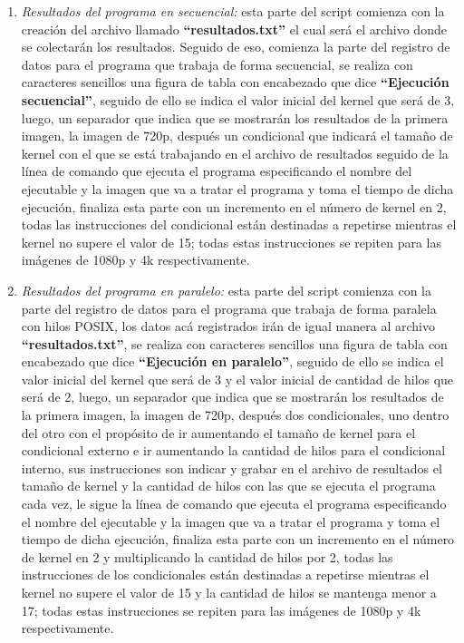 \documentclass[a4paper,10pt]{IEEEtran}
\begin{document}
\begin{enumerate}
\begin{enumerate}
        \item \textit{Resultados del programa en secuencial:} esta parte del script comienza con la creaci\'on del archivo llamado \textbf{“resultados.txt”} el cual ser\'a el archivo donde se colectar\'an los resultados. Seguido de eso, comienza la parte del registro de datos para el programa que trabaja de forma secuencial, se realiza con caracteres sencillos una figura de tabla con encabezado que dice
        \textbf{“Ejecución secuencial”}, seguido de ello se indica el valor inicial del kernel que ser\'a de 3, luego, un separador que indica que se mostrar\'an los resultados de la primera imagen, la imagen de 720p, despu\'es un condicional que indicar\'a el tama\~no de kernel con el que se est\'a trabajando en el archivo de resultados seguido de la l\'inea de comando que ejecuta el programa especificando el nombre del ejecutable y la imagen que va a tratar el programa y toma el tiempo de dicha ejecuci\'on, finaliza esta parte con un incremento en el n\'umero de kernel en 2, todas las instrucciones del condicional est\'an destinadas a repetirse mientras el kernel no supere el valor de 15; todas estas
        instrucciones se repiten para las im\'agenes de 1080p y 4k
        respectivamente. \\
        
        \item \textit{Resultados del programa en paralelo:} esta parte del script comienza con la parte del registro de datos para el programa que trabaja de forma paralela con hilos POSIX, los datos ac\'a registrados ir\'an de igual manera al archivo \textbf{“resultados.txt”}, se realiza con caracteres sencillos una figura de tabla con encabezado que dice \textbf{“Ejecuci\'on en paralelo”}, seguido de ello se indica el valor inicial del kernel que ser\'a de 3 y el valor inicial de cantidad de hilos que ser\'a de 2, luego, un separador que indica que se mostrar\'an los resultados de la primera imagen, la imagen de 720p, despu\'es dos
        condicionales, uno dentro del otro con el prop\'osito de ir aumentando el tama\~no de kernel para el condicional externo e ir aumentando la cantidad de hilos para el condicional interno, sus instrucciones son indicar y grabar en el archivo de resultados el tama\~no de kernel y la cantidad de hilos con las que se ejecuta el programa cada vez, le sigue
        la l\'inea de comando que ejecuta el programa especificando el nombre del ejecutable y la imagen que va a tratar el programa y toma el tiempo de dicha ejecuci\'on, finaliza esta parte con un incremento en el n\'umero de kernel en 2 y multiplicando la cantidad de hilos por 2, todas las instrucciones de los condicionales est\'an destinadas a repetirse mientras el kernel no supere el valor de 15 y la cantidad de hilos se mantenga menor a 17; todas estas instrucciones se repiten para las im\'agenes de 1080p y 4k respectivamente.
    \end{enumerate}
\end{enumerate}
\end{document}
